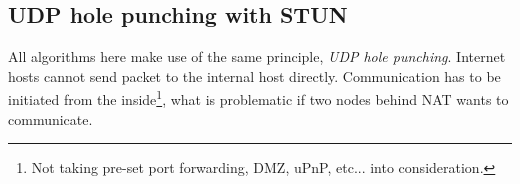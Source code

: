 \documentclass[twoside]{article}
\begin{document}
\begin{multicols}{2}
% 
% 
% 



\section{UDP hole punching with STUN}
All algorithms here make use of the same principle, \emph{UDP hole punching}. 
Internet hosts cannot send packet to the internal host directly. 
Communication has to be initiated from the inside\footnote{Not taking
pre-set port forwarding, DMZ, uPnP, etc... into consideration. }, what is problematic if two nodes behind 
NAT wants to communicate.


\end{multicols}
\end{document}
